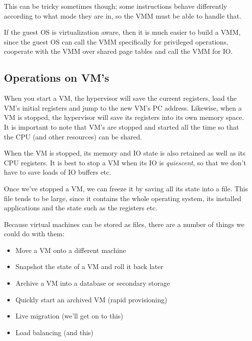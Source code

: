 This can be tricky sometimes though; some instructions behave differently
according to what mode they are in, so the VMM must be able to handle that.

If the guest OS is virtualization aware, then it is much easier to build a VMM,
since the guest OS can call the VMM specifically for privileged operations,
cooperate with the VMM over shared page tables and call the VMM for IO.

\subsection{Operations on VM's}

When you start a VM, the hypervisor will save the current registers, load the
VM's initial registers and jump to the new VM's PC address. Likewise, when a VM
is stopped, the hypervisor will save its registers into its own memory space. It
is important to note that VM's are stopped and started all the time so that the
CPU (and other resources) can be shared.

When the VM is stopped, its memory and IO state is also retained as well as its
CPU registers. It is best to stop a VM when its IO is \textit{quiescent}, so
that we don't have to save loads of IO buffers etc.

Once we've stopped a VM, we can freeze it by saving all its state into a file.
This file tends to be large, since it contains the whole operating system, its
installed applications and the state such as the registers etc.

Because virtual machines can be stored as files, there are a number of things we
could do with them:

\begin{mymulticols}
  \begin{itemize}
    \item Move a VM onto a different machine
    \item Snapshot the state of a VM and roll it back later
    \item Archive a VM into a database or secondary storage
    \item Quickly start an archived VM (rapid provisioning)
    \item Live migration (we'll get on to this)
    \item Load balancing (and this)
  \end{itemize}
\end{mymulticols}

